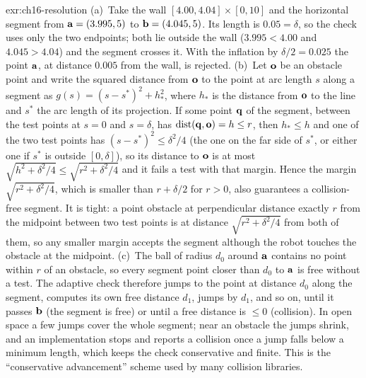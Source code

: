 
\begin{solution}{exr:ch16-resolution}
(a)~Take the wall $[4.00,4.04]\times[0,10]$ and the horizontal segment from $\mathbf{a}=(3.995,5)$ to $\mathbf{b}=(4.045,5)$. Its length is $0.05=\delta$, so the check uses only the two endpoints; both lie outside the wall ($3.995<4.00$ and $4.045>4.04$) and the segment crosses it. With the inflation by $\delta/2=0.025$ the point $\mathbf{a}$, at distance $0.005$ from the wall, is rejected. (b)~Let $\mathbf{o}$ be an obstacle point and write the squared distance from $\mathbf{o}$ to the point at arc length $s$ along a segment as $g(s)=(s-s^{*})^{2}+h_{*}^{2}$, where $h_{*}$ is the distance from $\mathbf{o}$ to the line and $s^{*}$ the arc length of its projection. If some point $\mathbf{q}$ of the segment, between the test points at $s=0$ and $s=\delta$, has $\operatorname{dist}(\mathbf{q},\mathbf{o})=h\le r$, then $h_{*}\le h$ and one of the two test points has $(s-s^{*})^{2}\le\delta^{2}/4$ (the one on the far side of $s^{*}$, or either one if $s^{*}$ is outside $[0,\delta]$), so its distance to $\mathbf{o}$ is at most $\sqrt{h^{2}+\delta^{2}/4}\le\sqrt{r^{2}+\delta^{2}/4}$ and it fails a test with that margin. Hence the margin $\sqrt{r^{2}+\delta^{2}/4}$, which is smaller than $r+\delta/2$ for $r>0$, also guarantees a collision-free segment. It is tight: a point obstacle at perpendicular distance exactly $r$ from the midpoint between two test points is at distance $\sqrt{r^{2}+\delta^{2}/4}$ from both of them, so any smaller margin accepts the segment although the robot touches the obstacle at the midpoint. (c)~The ball of radius $d_0$ around $\mathbf{a}$ contains no point within $r$ of an obstacle, so every segment point closer than $d_0$ to $\mathbf{a}$ is free without a test. The adaptive check therefore jumps to the point at distance $d_0$ along the segment, computes its own free distance $d_1$, jumps by $d_1$, and so on, until it passes $\mathbf{b}$ (the segment is free) or until a free distance is $\le0$ (collision). In open space a few jumps cover the whole segment; near an obstacle the jumps shrink, and an implementation stops and reports a collision once a jump falls below a minimum length, which keeps the check conservative and finite. This is the ``conservative advancement'' scheme used by many collision libraries.
\end{solution}

